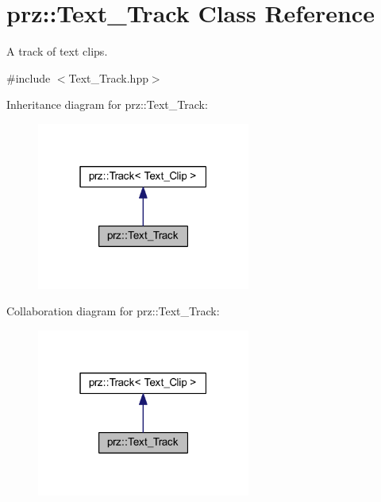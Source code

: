 \hypertarget{classprz_1_1_text___track}{}\section{prz\+::Text\+\_\+\+Track Class Reference}
\label{classprz_1_1_text___track}


A track of text clips.  




{\ttfamily \#include $<$Text\+\_\+\+Track.\+hpp$>$}



Inheritance diagram for prz\+::Text\+\_\+\+Track\+:
\nopagebreak
\begin{figure}[H]
\begin{center}
\leavevmode
\includegraphics[width=199pt]{classprz_1_1_text___track__inherit__graph}
\end{center}
\end{figure}


Collaboration diagram for prz\+::Text\+\_\+\+Track\+:
\nopagebreak
\begin{figure}[H]
\begin{center}
\leavevmode
\includegraphics[width=199pt]{classprz_1_1_text___track__coll__graph}
\end{center}
\end{figure}
